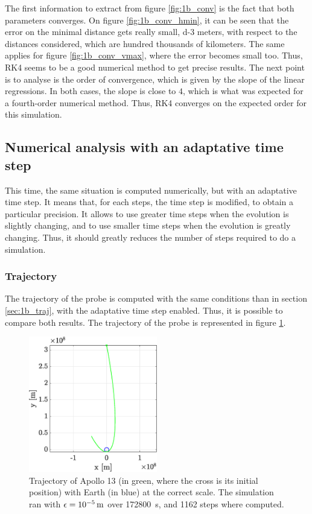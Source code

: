 \documentclass[a4paper,12pt,twoside]{article}
\begin{document}
The first information to extract from figure \ref{fig:1b_conv} is the fact that both parameters converges.
On figure \ref{fig:1b_conv_hmin}, it can be seen that the error on the minimal distance gets really small, \num{d-3} meters, with respect to the distances considered, which are hundred thousands of kilometers.
The same applies for figure \ref{fig:1b_conv_vmax}, where the error becomes small too.
Thus, RK4 seems to be a good numerical method to get precise results.
The next point is to analyse is the order of convergence, which is given by the slope of the linear regressions.
In both cases, the slope is close to $4$, which is what was expected for a fourth-order numerical method.
Thus, RK4 converges on the expected order for this simulation.

\subsection{Numerical analysis with an adaptative time step}
This time, the same situation is computed numerically, but with an adaptative time step.
It means that, for each steps, the time step is modified, to obtain a particular precision.
It allows to use greater time steps when the evolution is slightly changing, and to use smaller time steps when the evolution is greatly changing.
Thus, it should greatly reduces the number of steps required to do a simulation.

\subsubsection{Trajectory}
The trajectory of the probe is computed with the same conditions than in section \ref{sec:1b_traj}, with the adaptative time step enabled.
Thus, it is possible to compare both results.
The trajectory of the probe is represented in figure \ref{fig:1c_traj}.

\begin{figure}
  \centering
  \includegraphics[width=0.5\textwidth]{graphs/ex1c_traj.eps}
  \caption{Trajectory of Apollo 13 (in green, where the cross is its initial position) with Earth (in blue) at the correct scale. The simulation ran with $\epsilon=\SI{d-5}{\m}$ over \SI{172800}{\s}, and \num{1162} steps where computed.}
  \label{fig:1c_traj}
\end{figure}
\end{document}
